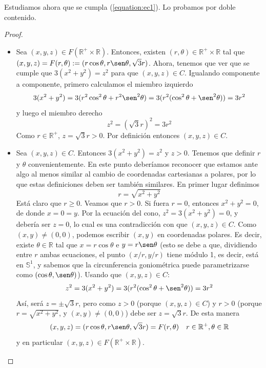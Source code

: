 \documentclass[12pt]{article}
\newcommand{\R}{\mathbb{R}}
\newcommand{\Rmas}{\R^{+}}
\newcommand{\Ss}{\mathbb{S}}
\begin{document}
\begin{ejercicio}
\begin{enumerate}
            \newpage

            Estudiamos ahora que se cumpla (\ref{equation:ec1}). Lo probamos por doble contenido.
            \begin{proof}~
                \begin{itemize}
                    \item[$\subseteq)$] Sea $(x,y,z) \in F(\Rmas \times \R)$. Entonces, existen $(r,\theta) \in \Rmas \times \R$ tal que
                    $(x,y,z) = F(r, \theta) := (r \cos \theta, r \sen \theta, \sqrt{3} r)$. Ahora, tenemos que ver que se cumple que
                    $3(x^2 + y^2) = z^2$ para que $(x,y,z) \in C$. Igualando componente a componente, primero calculamos el miembro izquierdo
                    $$3(x^2 + y^2) = 3(r^2 \cos^2 \theta + r^2 \sen^2 \theta) = 3(r^2 (\cos^2 \theta + \sen^2 \theta)) = 3r^2$$
                    y luego el miembro derecho
                    $$z^2 = (\sqrt{3} r)^2 = 3r^2$$
                    Como $r \in \Rmas$, $z = \sqrt{3} r > 0$. Por definición entonces $(x,y,z) \in C$.
                    \item[$\supseteq$] Sea $(x,y,z) \in C$. Entonces $3(x^2 + y^2) = z^2$ y $z > 0$. Tenemos que definir $r$ y $\theta$ convenientemente. En este
                    punto deberíamos reconocer que estamos ante algo al menos similar al cambio de coordenadas cartesianas a polares, por lo que estas 
                    definiciones deben ser también similares. En primer lugar definimos 
                    $$r = \sqrt{x^2 + y^2}$$
                    Está claro que $r \geq 0$. Veamos que $r > 0$. Si fuera $r = 0$, entonces $x^2 + y^2 = 0$, de donde $x = 0 = y$. Por la ecuación
                    del cono, $z^2 = 3(x^2 + y^2) = 0$, y debería ser $z = 0$, lo cual es una contradicción con que $(x,y,z) \in C$. Como $(x,y) \neq (0,0)$,
                    podemos escribir $(x,y)$ en coordenadas polares. Es decir, existe $\theta \in \R$ tal que $x = r \cos \theta$ e $y = r \sen \theta$ (esto
                    se debe a que, dividiendo entre $r$ ambas ecuaciones, el punto $(x/r, y/r)$ tiene módulo 1, es decir, está en $\Ss^1$, y sabemos
                    que la circunferencia goniométrica puede parametrizarse como $(\cos \theta, \sen \theta)$). Usando que $(x,y,z) \in C$:
                    $$z^2 = 3(x^2 + y^2) = 3(r^2 (\cos^2 \theta + \sen^2 \theta)) = 3r^2$$ 
                    Así, será $z = \pm \sqrt{3}r$, pero como $z > 0$ (porque $(x,y,z) \in C$) y $r > 0$ (porque $r = \sqrt{x^2 + y^2}$, y $(x,y) \neq (0,0)$)
                    debe ser $z = \sqrt{3} r$. De esta manera
                    $$(x,y,z) = (r \cos \theta, r \sen \theta, \sqrt{3} r) = F(r, \theta) \quad r \in \Rmas, \theta \in \R$$
                    y en particular $(x,y,z) \in F(\Rmas \times \R)$. \qedhere
                \end{itemize}
            \end{proof}
            

\end{enumerate}
\end{ejercicio}
\end{document}
